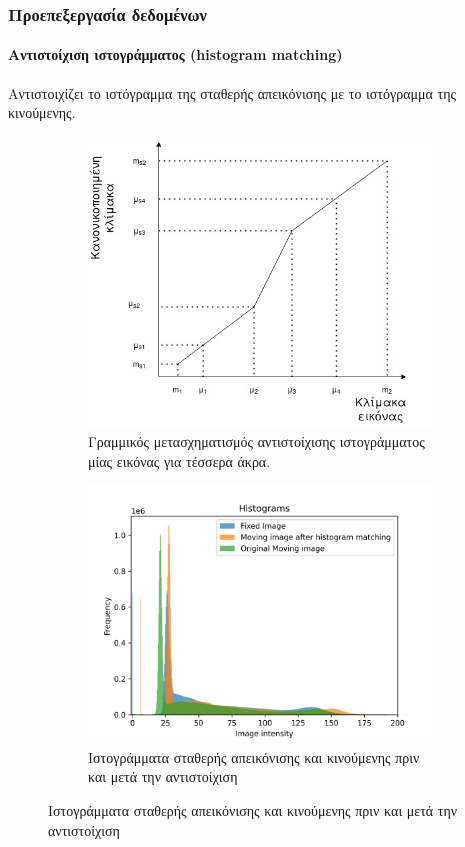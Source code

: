 \documentclass{beamer}
\begin{document}
\begin{frame}
\frametitle{Προεπεξεργασία δεδομένων}
\framesubtitle{Αντιστοίχιση ιστογράμματος (histogram matching)}

Αντιστοιχίζει το ιστόγραμμα της σταθερής απεικόνισης με το ιστόγραμμα της
κινούμενης.

\begin{figure}[H]
    \centering
    \begin{subfigure}[t]{0.4\linewidth}
    \includegraphics[width=\textwidth]{histogram_matching_2}
    \caption{Γραμμικός μετασχηματισμός αντιστοίχισης ιστογράμματος μίας εικόνας
             για τέσσερα άκρα.}
    \end{subfigure}
    \begin{subfigure}[t]{0.4\linewidth}
    \includegraphics[width=\linewidth]{histogram_plot.png}
    \caption{Ιστογράμματα σταθερής απεικόνισης και κινούμενης πριν και μετά την
             αντιστοίχιση}
    \end{subfigure}

    \label{fig:histogram_matching:1}
\end{figure}
\end{frame}
\end{document}
